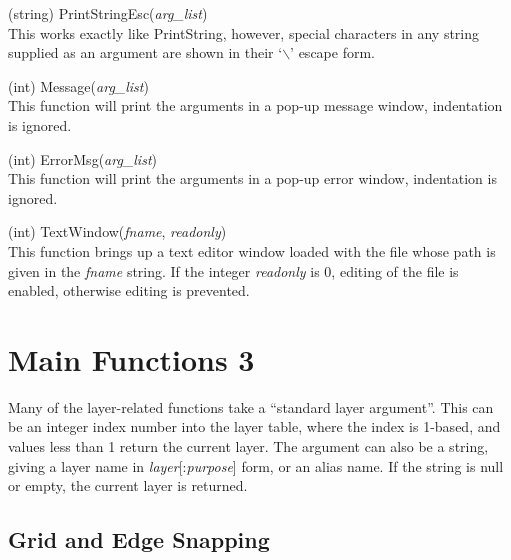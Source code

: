 \begin{description}
\item{(string) \vt PrintStringEsc({\it arg\_list\/})}\\
This works exactly like {\vt PrintString}, however, special characters
in any string supplied as an argument are shown in their
`$\backslash$' escape form.

\item{(int) \vt Message({\it arg\_list\/})}\\
This function will print the arguments in a pop-up message window,
indentation is ignored.

\item{(int) \vt ErrorMsg({\it arg\_list\/})}\\
This function will print the arguments in a pop-up error window,
indentation is ignored.

\item{(int) \vt TextWindow({\it fname\/}, {\it readonly\/})}\\
This function brings up a text editor window loaded with the file
whose path is given in the {\it fname} string.  If the integer {\it
readonly} is 0, editing of the file is enabled, otherwise editing is
prevented.

\end{description}


\section{Main Functions 3}

Many of the layer-related functions take a ``standard layer
argument''.  This can be an integer index number into the layer table,
where the index is 1-based, and values less than 1 return the current
layer.  The argument can also be a string, giving a layer name in {\it
layer\/}[{\vt :}{\it purpose\/}] form, or an alias name.  If the
string is null or empty, the current layer is returned.

\subsection{Grid and Edge Snapping}


